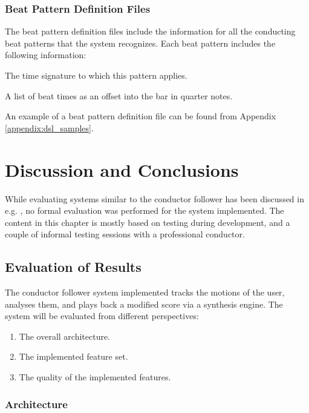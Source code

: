 \subsection{Beat Pattern Definition Files}
\label{sec:beat_pattern_definition_format}

The beat pattern definition files include the
information for all the conducting beat patterns
that the system recognizes.
Each beat pattern includes the following information:
\begin{description}[leftmargin=24ex]
\item[Meter] The time signature to which this pattern applies.
\item[Beats] A list of beat times as an offset into the bar in quarter notes.
\end{description}
An example of a beat pattern definition file can be found from Appendix
\ref{appendix:dsl_samples}.

\chapter{Discussion and Conclusions}
\label{chapter:discussion}

While evaluating systems similar to the
conductor follower has been discussed
in e.g. \cite{Bresin2012},
no formal evaluation was performed for
the system implemented.
The content in this chapter is mostly based
on testing during development,
and a couple of informal testing sessions with 
a professional conductor.

\section{Evaluation of Results}

The conductor follower system implemented
tracks the motions of the user,
analyses them,
and plays back a modified score
via a synthesis engine.
The system will be evaluated from
different perspectives:
\begin{enumerate}
\item The overall architecture.
\item The implemented feature set.
\item The quality of the implemented features.
\label{item:last_evaluation_perspective}
\end{enumerate}

\subsection{Architecture}

